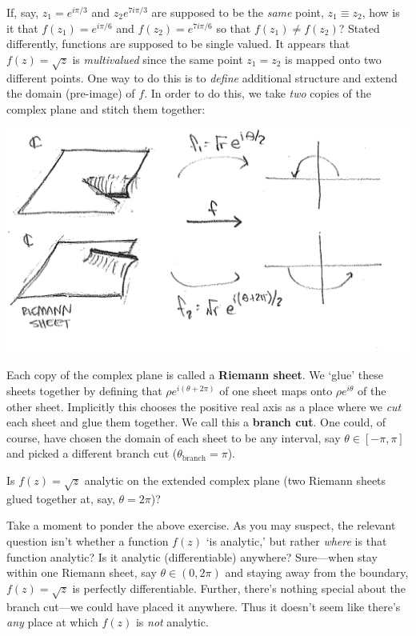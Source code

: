 If, say, $z_1=e^{i\pi/3}$ and $ z_2 e^{7i\pi/3}$ are supposed to be the \emph{same} point, $z_1\equiv z_2$, how is it that $f(z_1) = e^{i\pi/6}$ and $f(z_2) = e^{7i\pi/6}$ so that $f(z_1)\neq f(z_2)$? Stated differently, functions are supposed to be single valued. It appears that $f(z)=\sqrt{z}$ is \emph{multivalued} since the same point $z_1=z_2$ is mapped onto two different points. One way to do this is to \emph{define} additional structure and extend the domain (pre-image) of $f$. In order to do this, we take \emph{two} copies of the complex plane and stitch them together:
\begin{center}
\includegraphics[width=.8\textwidth]{figures/lec13_map4.png}
\end{center}
Each copy of the complex plane is called a \textbf{Riemann sheet}. We `glue' these sheets together by defining that $\rho e^{i(\theta+2\pi)}$ of one sheet maps onto $\rho e^{i\theta}$ of the other sheet. Implicitly this chooses the positive real axis as a place where we \emph{cut} each sheet and glue them together. We call this a \textbf{branch cut}. One could, of course, have chosen the domain of each sheet to be any interval, say $\theta \in [-\pi,\pi]$ and picked a different branch cut ($\theta_\text{branch} = \pi$). 
\begin{exercise}
Is $f(z)=\sqrt{z}$ analytic on the extended complex plane (two Riemann sheets glued together at, say, $\theta=2\pi$)?
\end{exercise}
Take a moment to ponder the above exercise. As you may suspect, the relevant question isn't whether a function $f(z)$ `is analytic,' but rather \emph{where} is that function analytic? Is it analytic (differentiable) anywhere? Sure---when stay within one Riemann sheet, say $\theta\in (0,2\pi)$ and staying away from the boundary, $f(z)=\sqrt{z}$ is perfectly differentiable. Further, there's nothing special about the branch cut---we could have placed it anywhere. Thus it doesn't seem like there's \emph{any} place at which $f(z)$ is \emph{not} analytic. 

